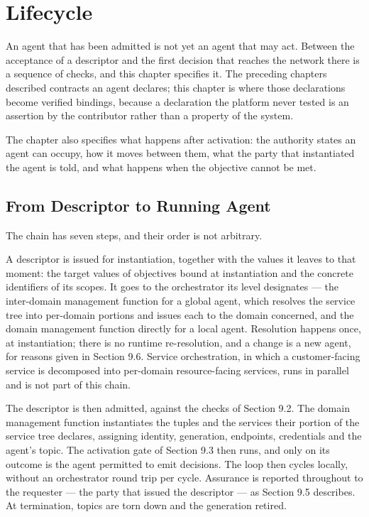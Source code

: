 
\hypertarget{lifecycle}{%
\section{Lifecycle}\label{lifecycle}}

An agent that has been admitted is not yet an agent that may act.
Between the acceptance of a descriptor and the first decision that
reaches the network there is a sequence of checks, and this chapter
specifies it. The preceding chapters described contracts an agent
declares; this chapter is where those declarations become verified
bindings, because a declaration the platform never tested is an
assertion by the contributor rather than a property of the system.

The chapter also specifies what happens after activation: the authority
states an agent can occupy, how it moves between them, what the party
that instantiated the agent is told, and what happens when the objective
cannot be met.

\hypertarget{from-descriptor-to-running-agent}{%
\subsection{From Descriptor to Running Agent}\label{from-descriptor-to-running-agent}}

The chain has seven steps, and their order is not arbitrary.

A descriptor is issued for instantiation, together with the values it
leaves to that moment: the target values of objectives bound at
instantiation and the concrete identifiers of its scopes. It goes to the
orchestrator its level designates --- the inter-domain management
function for a global agent, which resolves the service tree into
per-domain portions and issues each to the domain concerned, and the
domain management function directly for a local agent. Resolution
happens once, at instantiation; there is no runtime re-resolution, and a
change is a new agent, for reasons given in Section 9.6. Service
orchestration, in which a customer-facing service is decomposed into
per-domain resource-facing services, runs in parallel and is not part of
this chain.

The descriptor is then admitted, against the checks of Section 9.2. The
domain management function instantiates the tuples and the services
their portion of the service tree declares, assigning identity,
generation, endpoints, credentials and the agent's topic. The activation
gate of Section 9.3 then runs, and only on its outcome is the agent
permitted to emit decisions. The loop then cycles locally, without an
orchestrator round trip per cycle. Assurance is reported throughout to
the requester --- the party that issued the descriptor --- as Section
9.5 describes. At termination, topics are torn down and the generation
retired.

